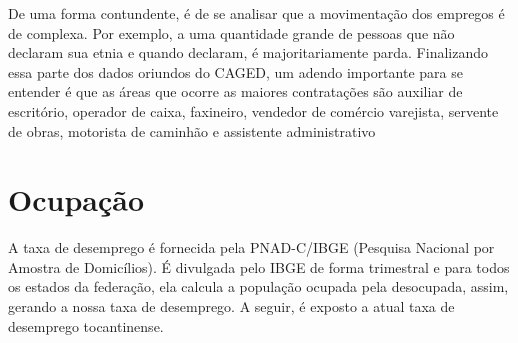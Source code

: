 \par De uma forma contundente, é de se analisar que a movimentação dos empregos é de complexa. Por exemplo, a uma quantidade grande de pessoas que não declaram sua etnia e quando declaram, é majoritariamente parda. Finalizando essa parte dos dados oriundos do CAGED, um adendo importante para se entender é que as áreas que ocorre as maiores contratações são auxiliar de escritório, operador de caixa, faxineiro, vendedor de comércio varejista, servente de obras, motorista de caminhão e assistente administrativo


\section{Ocupação}

\par A taxa de desemprego é fornecida pela PNAD-C/IBGE (Pesquisa Nacional por Amostra de Domicílios). É divulgada pelo IBGE de forma trimestral e para todos os estados da federação, ela calcula a população ocupada pela desocupada, assim, gerando a nossa taxa de desemprego. A seguir, é exposto a atual taxa de desemprego tocantinense.

